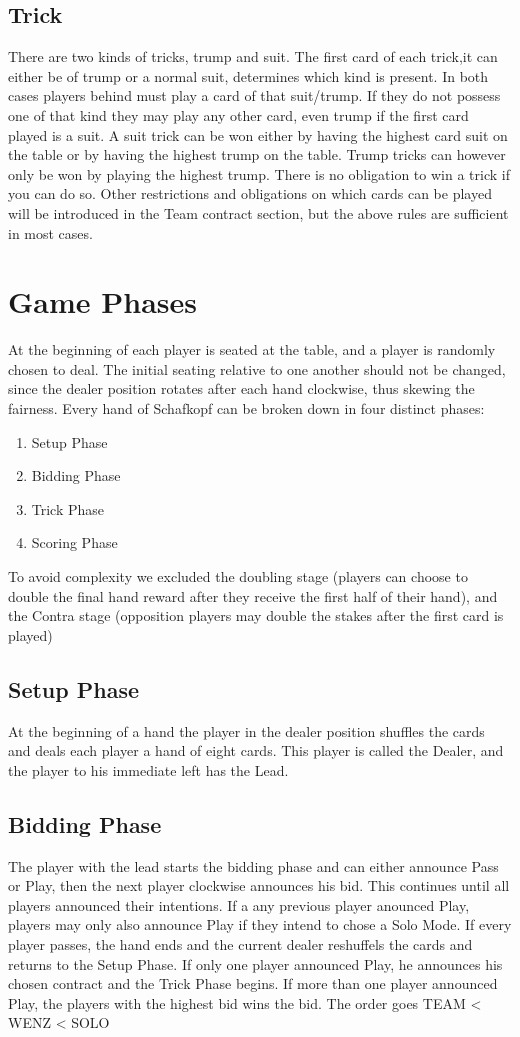 \subsection{Trick}
There are two kinds of tricks, trump and suit.
The first card of each trick,it can either be of trump or a normal suit, determines which kind is present.
In both cases players behind must play a card of that suit/trump.
If they do not possess one of that kind they may play any other card, even trump if the first card played is a suit.
\newline
A suit trick can be won either by having the highest card suit on the table or by having the highest trump on the table.
Trump tricks can however only be won by playing the highest trump.
There is no obligation to win a trick if you can do so.
Other restrictions and obligations on which cards can be played will be introduced in the Team contract section,
but the above rules are sufficient in most cases.
\section{Game Phases}
At the beginning of each player is seated at the table, and a player is randomly chosen to deal.
The initial seating relative to one another should not be changed, since the dealer position rotates after each hand
clockwise, thus
skewing the fairness.
\newline
Every hand of Schafkopf can be broken down in four distinct phases:
\begin{enumerate}
    \item Setup Phase
    \item Bidding Phase
    \item Trick Phase
    \item Scoring Phase
\end{enumerate}
To avoid complexity we excluded the doubling stage (players can choose to double the final hand reward after they
receive the first half of their hand), and the Contra stage (opposition players may double the stakes after the first card is played)
\subsection{Setup Phase}
At the beginning of a hand the player in the dealer position shuffles the cards and deals each player a hand of eight
cards.
This player is called the Dealer, and the player to his immediate left has the Lead.
\subsection{Bidding Phase}
The player with the lead starts the bidding phase and can either announce Pass or Play, then the next player clockwise announces his bid.
This continues until all players announced their intentions.
If a any previous player anounced Play, players may only also announce Play if they intend to chose a Solo Mode.
If every player passes, the hand ends and the current dealer reshuffels the cards and returns to
the Setup Phase.
If only one player announced Play, he announces his chosen contract and the Trick Phase begins.
If more than one player announced Play, the players with the highest bid wins the bid.
The order goes TEAM < WENZ < SOLO
